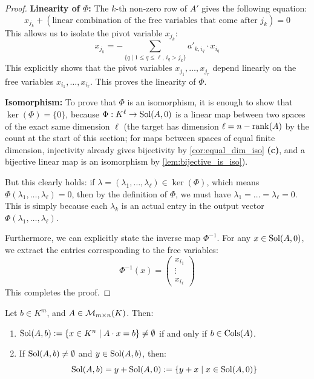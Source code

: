 \begin{proof}
\textbf{Linearity of $\Phi$:} The $k$-th non-zero row of $A'$ gives the following equation:
\begin{equation*}
    x_{j_k} + (\text{linear combination of the free variables that come after } j_k) = 0
\end{equation*}
This allows us to isolate the pivot variable $x_{j_k}$:
\begin{equation*}
    x_{j_k} = - \sum_{\{q \mid 1 \le q \le \ell, \, i_q > j_k\}} a'_{k, i_q} \cdot x_{i_q}
\end{equation*}
This explicitly shows that the pivot variables $x_{j_1}, \dots, x_{j_r}$ depend linearly on the free variables $x_{i_1}, \dots, x_{i_\ell}$. This proves the linearity of $\Phi$.

\textbf{Isomorphism:} To prove that $\Phi$ is an isomorphism, it is enough to show that $\ker(\Phi) = \{0\}$, because $\Phi: K^\ell \to \operatorname{Sol}(A, 0)$ is a linear map between two spaces of the exact same dimension $\ell$ (the target has dimension $\ell = n - \operatorname{rank}(A)$ by the count at the start of this section; for maps between spaces of equal finite dimension, injectivity already gives bijectivity by \cref{cor:equal_dim_iso} \textbf{(c)}, and a bijective linear map is an isomorphism by \cref{lem:bijective_is_iso}).

But this clearly holds: if $\lambda = (\lambda_1, \dots, \lambda_\ell) \in \ker(\Phi)$, which means $\Phi(\lambda_1, \dots, \lambda_\ell) = 0$, then by the definition of $\Phi$, we must have $\lambda_1 = \dots = \lambda_\ell = 0$. This is simply because each $\lambda_k$ is an actual entry in the output vector $\Phi(\lambda_1, \dots, \lambda_\ell)$.

Furthermore, we can explicitly state the inverse map $\Phi^{-1}$. For any $x \in \operatorname{Sol}(A, 0)$, we extract the entries corresponding to the free variables:
\begin{equation*}
    \Phi^{-1}(x) = \begin{pmatrix} x_{i_1} \\ \vdots \\ x_{i_\ell} \end{pmatrix}
\end{equation*}
This completes the proof.
\end{proof}

\begin{corollary}
\label{cor:non_homogeneous_solutions}
Let $b \in K^m$, and $A \in \mathcal{M}_{m \times n}(K)$. Then:
\begin{enumerate}
    \item $\operatorname{Sol}(A, b) := \{x \in K^n \mid A \cdot x = b\} \neq \emptyset$ if and only if $b \in \operatorname{Cols}(A)$.
    \item If $\operatorname{Sol}(A, b) \neq \emptyset$ and $y \in \operatorname{Sol}(A, b)$, then:
    \begin{equation*}
        \operatorname{Sol}(A, b) = y + \operatorname{Sol}(A, 0) := \{y + x \mid x \in \operatorname{Sol}(A, 0)\}
    \end{equation*}
\end{enumerate}
\end{corollary}

